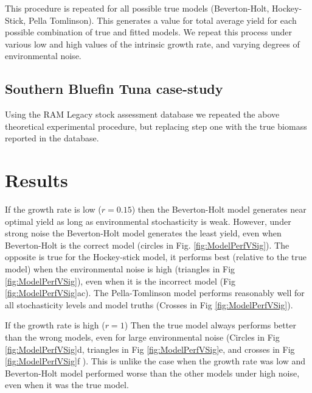 \documentclass[]{elsarticle} %
\begin{document}
This procedure is repeated for all possible true models (Beverton-Holt, Hockey-Stick, Pella Tomlinson). This generates a value for total average yield for each possible combination of true and fitted models. We repeat this process under various low and high values of the intrinsic growth rate, and varying degrees of environmental noise.

\subsection{Southern Bluefin Tuna case-study}
Using the RAM Legacy stock assessment database \citep{ricard2012} we repeated the above theoretical experimental procedure, but replacing step one with the true biomass reported in the database. 

\section{Results}

If the growth rate is low ($r=0.15$) then the Beverton-Holt model generates near optimal yield as long as environmental stochasticity is weak. However, under strong noise the Beverton-Holt model generates the least yield, even when Beverton-Holt is the correct model (circles in Fig. \ref{fig:ModelPerfVSig}). The opposite is true for the Hockey-stick model, it performs best (relative to the true model) when the environmental noise is high (triangles in Fig \ref{fig:ModelPerfVSig}), even when it is the incorrect model (Fig \ref{fig:ModelPerfVSig}ac). The Pella-Tomlinson model performs reasonably well for all stochasticity levels and model truths (Crosses in Fig \ref{fig:ModelPerfVSig}).

If the growth rate is high ($r=1$) Then the true model always performs better than the wrong models, even for large environmental noise (Circles in Fig \ref{fig:ModelPerfVSig}d, triangles in Fig \ref{fig:ModelPerfVSig}e, and crosses in Fig \ref{fig:ModelPerfVSig}f ). This is unlike the case when the growth rate was low and Beverton-Holt model performed worse than the other models under high noise, even when it was the true model. 
\end{document}
